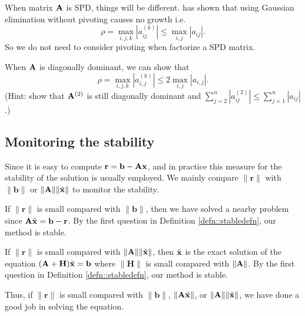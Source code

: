 \begin{exm}
    When matrix ${\mathbf{A}}$ is SPD, things will be different. 
    \cite{Wilkinson1961} has shown that using Gaussian 
    elimination without pivoting causes no growth i.e.
    $$
        \rho=\max_{i,j,k}|a_{ij}^{(k)}|\leq\max_{i,j}|a_{ij}|.
    $$ 
    So we do not need to consider pivoting when factorize a 
    SPD matrix.
\end{exm}

\begin{exm}
    When ${\mathbf{A}}$ is diagonally dominant, we can show that
    $$
        \rho=\max_{i,j,k}|a_{i,j}^{(k)}|\leq 
        2\max_{i,j}|a_{i,j}|.
    $$ 
    (Hint: show that ${\mathbf{A}}^{(2)}$ is still diagonally dominant 
    and $\sum_{j=2}^n|a_{ij}^{(2)}|\leq\sum_{j=1}^n|a_{ij}|$.)
\end{exm}

\subsection{Monitoring the stability}
\begin{defn}
    Since it is easy to compute $\mathbf{r}=\mathbf{b}-{\mathbf{A}}{\mathbf{x}}$, 
    and in practice this measure for the stability of the 
    solution is usually employed. We mainly compare 
    $\|\mathbf{r}\|$ with $\|\mathbf{b}\|$ or $\|{\mathbf{A}}\|
    \|\tilde{{\mathbf{x}}}\|$ to monitor the stability.

    If $\|\mathbf{r}\|$ is small compared with $\|\mathbf{b}\|$, 
    then we have solved a nearby problem since ${\mathbf{A}}\tilde{{\mathbf{x}}}=
    \mathbf{b}-\mathbf{r}$. By the first question in Definition 
    \ref{defn::stabledefn}, our method is stable.

    If $\|\mathbf{r}\|$ is small compared with $\|{\mathbf{A}}\|
    \|\tilde{{\mathbf{x}}}\|$, then $\tilde{{\mathbf{x}}}$ is the exact solution 
    of the equation $({\mathbf{A}}+\mathbf{H})\tilde{{\mathbf{x}}}=\mathbf{b}$ 
    where $\|\mathbf{H}\|$ is small compared with $\|{\mathbf{A}}\|$. 
    By the first question in Definition \ref{defn::stabledefn}, 
    our method is stable.

    Thus, if $\|\mathbf{r}\|$ is small compared with 
    $\|\mathbf{b}\|$, $\|{\mathbf{A}}\tilde{{\mathbf{x}}}\|$, or $\|{\mathbf{A}}\|
    \|\tilde{{\mathbf{x}}}\|$, we have done a good job in solving the 
    equation.
\end{defn}

